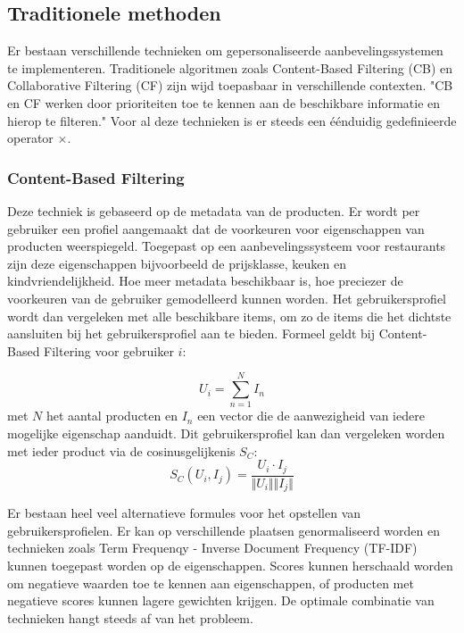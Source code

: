 \subsection{Traditionele methoden}
\label{sec:chapt2_traditionele_methoden}
Er bestaan verschillende technieken om gepersonaliseerde aanbevelingssystemen te implementeren. Traditionele algoritmen zoals Content-Based Filtering (CB) en Collaborative Filtering (CF) zijn wijd toepasbaar in verschillende contexten. "CB en CF werken door prioriteiten toe te kennen aan de beschikbare informatie en hierop te filteren." \cite{overzicht_technieken} Voor al deze technieken is er steeds een éénduidig gedefinieerde operator $\times$.


\subsubsection{Content-Based Filtering}
\label{seq:chapt2_cb}
Deze techniek is gebaseerd op de metadata van de producten. Er wordt per gebruiker een profiel aangemaakt dat de voorkeuren voor eigenschappen van producten weerspiegeld. Toegepast op een aanbevelingssysteem voor restaurants zijn deze eigenschappen bijvoorbeeld de prijsklasse, keuken en kindvriendelijkheid. Hoe meer metadata beschikbaar is, hoe preciezer de voorkeuren van de gebruiker gemodelleerd kunnen worden. Het gebruikersprofiel wordt dan vergeleken met alle beschikbare items, om zo de items die het dichtste aansluiten bij het gebruikersprofiel aan te bieden. Formeel geldt bij Content-Based Filtering voor gebruiker $i$:


\begin{equation}
    U_i = \sum_{n=1}^{N} I_n
    \label{eq:chap2_cb_user_profile}
\end{equation}
met $N$ het aantal producten en $I_n$ een vector die de aanwezigheid van iedere mogelijke eigenschap aanduidt. Dit gebruikersprofiel kan dan vergeleken worden met ieder product via de cosinusgelijkenis $S_C$:
\begin{equation}
    S_C(U_i, I_j) = \frac{U_i \cdot I_j}{\Vert U_i \Vert \Vert I_j \Vert}
    \label{eq:chap2_cb_cosine_similarity}
\end{equation}

Er bestaan heel veel alternatieve formules voor het opstellen van gebruikersprofielen. Er kan op verschillende plaatsen genormaliseerd worden en technieken zoals Term Frequenqy - Inverse Document Frequency (TF-IDF) kunnen toegepast worden op de eigenschappen. Scores kunnen herschaald worden om negatieve waarden toe te kennen aan eigenschappen, of producten met negatieve scores kunnen lagere gewichten krijgen. De optimale combinatie van technieken hangt steeds af van het probleem.

